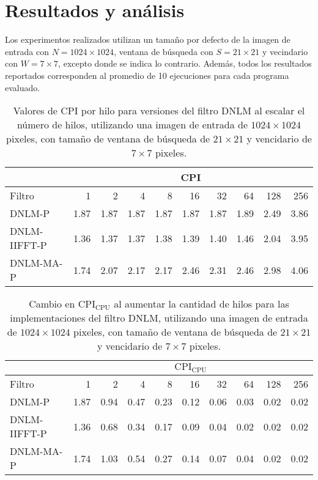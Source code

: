\chapter{Resultados y análisis}
\label{ch:res}

Los experimentos realizados utilizan un tama\~no por defecto de la imagen de entrada con $N = 1024 \times 1024$, ventana de búsqueda con $S = 21 \times 21$ y vecindario con $W = 7 \times 7$, excepto donde se indica lo contrario. Adem\'as, todos los resultados reportados corresponden al promedio de 10 ejecuciones para cada programa evaluado.  


\begin{table}
\centering
\caption[Valores de CPI de los filtros al escalar el n\'umero de hilos]{Valores de CPI por hilo para versiones del filtro DNLM al escalar el n\'umero de hilos, utilizando una imagen de entrada de $1024 \times 1024$ pixeles, con tama\~no de ventana de búsqueda de $21 \times 21$ y vencidario de $7 \times 7$ pixeles. \label{tabla:cpi}}
\begin{tabular}{lrrrrrrrrr}
& \multicolumn{9}{c}{CPI} \tabularnewline
\hline
 Filtro & 1 & 2 & 4 & 8 & 16 & 32 & 64 & 128 & 256 \tabularnewline
\hline
DNLM-P & 1.87 & 1.87 & 1.87 & 1.87 & 1.87 & 1.87 & 1.89 & 2.49 & 3.86 \tabularnewline
DNLM-IIFFT-P & 1.36 & 1.37 & 1.37 & 1.38 & 1.39 & 1.40 & 1.46 & 2.04 & 3.95 \tabularnewline
DNLM-MA-P & 1.74 & 2.07 & 2.17 & 2.17 & 2.46 & 2.31 & 2.46 & 2.98 & 4.06 \tabularnewline
\end{tabular}
\end{table}
  
  
  
  
\begin{table}
\centering
\caption[Efecto de $\text{CPI}_{\text{CPU}}$ de los filtros al escalar el n\'umero de hilos]{Cambio en $\text{CPI}_{\text{CPU}}$ al aumentar la cantidad de hilos para las implementaciones del filtro DNLM, utilizando una imagen de entrada de $1024 \times 1024$ pixeles, con tama\~no de ventana de búsqueda de $21 \times 21$ y vencidario de $7 \times 7$ pixeles. \label{tabla:cpic}}
\begin{tabular}{lrrrrrrrrr}
& \multicolumn{9}{c}{$\text{CPI}_{\text{CPU}}$} \tabularnewline
\hline
 Filtro & 1 & 2 & 4 & 8 & 16 & 32 & 64 & 128 & 256 \tabularnewline
\hline
DNLM-P & 1.87 & 0.94 & 0.47 & 0.23 & 0.12 & 0.06 & 0.03 & 0.02 & 0.02 \tabularnewline
DNLM-IIFFT-P & 1.36 & 0.68 & 0.34 & 0.17 & 0.09 & 0.04 & 0.02 & 0.02 & 0.02 \tabularnewline
DNLM-MA-P & 1.74 & 1.03 & 0.54 & 0.27 & 0.14 & 0.07 & 0.04 & 0.02 & 0.02 \tabularnewline
\end{tabular}
\end{table}


